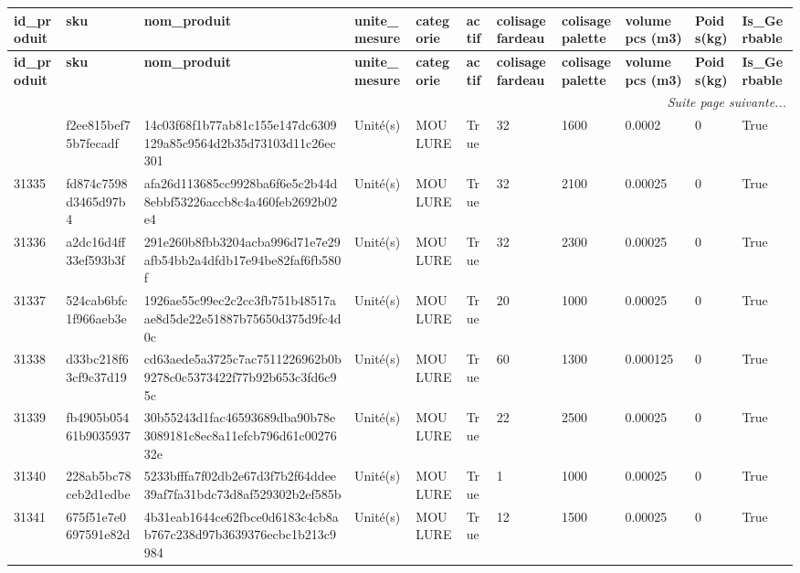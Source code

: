 \documentclass[a4paper,11pt]{article}
\begin{document}
\begin{landscape}
\tiny
\begin{longtable}{|l|l|l|l|l|l|l|l|l|l|l|}
\hline
\rowcolor{headerblue}
\textbf{id\_produit} & \textbf{sku} & \textbf{nom\_produit} & \textbf{unite\_mesure} & \textbf{categorie} & \textbf{actif} & \textbf{colisage fardeau} & \textbf{colisage palette} & \textbf{volume pcs (m3)} & \textbf{Poids(kg)} & \textbf{Is\_Gerbable} \\ \hline
\endfirsthead
\hline
\rowcolor{headerblue}
\textbf{id\_produit} & \textbf{sku} & \textbf{nom\_produit} & \textbf{unite\_mesure} & \textbf{categorie} & \textbf{actif} & \textbf{colisage fardeau} & \textbf{colisage palette} & \textbf{volume pcs (m3)} & \textbf{Poids(kg)} & \textbf{Is\_Gerbable} \\ \hline
\endhead
\hline \multicolumn{11}{|r|}{\textit{Suite page suivante...}} \\ \hline
\endfoot
\hline
\endlastfoot
 31334 & f2ee815bef75b7fecadf & 14c03f68f1b77ab81c155e147dc6309129a85c9564d2b35d73103d11c26ec301 & Unité(s) & MOULURE & True & 32 & 1600 & 0.0002 & 0 & True \\ \hline
\rowcolor{rowgray} 31335 & fd874c7598d3465d97b4 & afa26d113685cc9928ba6f6e5c2b44d8ebbf53226accb8c4a460feb2692b02e4 & Unité(s) & MOULURE & True & 32 & 2100 & 0.00025 & 0 & True \\ \hline
 31336 & a2dc16d4ff33ef593b3f & 291e260b8fbb3204acba996d71e7e29afb54bb2a4dfdb17e94be82faf6fb580f & Unité(s) & MOULURE & True & 32 & 2300 & 0.00025 & 0 & True \\ \hline
\rowcolor{rowgray} 31337 & 524cab6bfc1f966aeb3e & 1926ae55c99ec2c2cc3fb751b48517aae8d5de22e51887b75650d375d9fc4d0c & Unité(s) & MOULURE & True & 20 & 1000 & 0.00025 & 0 & True \\ \hline
 31338 & d33bc218f63cf9c37d19 & cd63aede5a3725c7ac7511226962b0b9278c0c5373422f77b92b653c3fd6c95c & Unité(s) & MOULURE & True & 60 & 1300 & 0.000125 & 0 & True \\ \hline
\rowcolor{rowgray} 31339 & fb4905b05461b9035937 & 30b55243d1fac46593689dba90b78e3089181c8ec8a11efcb796d61c0027632e & Unité(s) & MOULURE & True & 22 & 2500 & 0.00025 & 0 & True \\ \hline
 31340 & 228ab5bc78ceb2d1edbe & 5233bfffa7f02db2e67d3f7b2f64ddee39af7fa31bdc73d8af529302b2ef585b & Unité(s) & MOULURE & True & 1 & 1000 & 0.00025 & 0 & True \\ \hline
\rowcolor{rowgray} 31341 & 675f51e7e0697591e82d & 4b31eab1644ce62fbce0d6183c4cb8ab767c238d97b3639376ecbc1b213c9984 & Unité(s) & MOULURE & True & 12 & 1500 & 0.00025 & 0 & True \\ \hline

\end{longtable}
\end{landscape}
\end{document}
